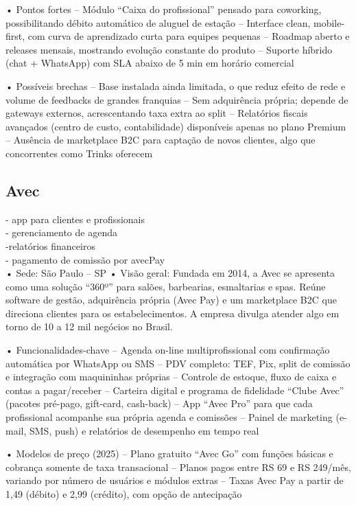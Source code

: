 • Pontos fortes
– Módulo “Caixa do profissional” pensado para coworking, possibilitando débito automático de aluguel de estação
– Interface clean, mobile-first, com curva de aprendizado curta para equipes pequenas
– Roadmap aberto e releases mensais, mostrando evolução constante do produto
– Suporte híbrido (chat + WhatsApp) com SLA abaixo de 5 min em horário comercial

• Possíveis brechas
– Base instalada ainda limitada, o que reduz efeito de rede e volume de feedbacks de grandes franquias
– Sem adquirência própria; depende de gateways externos, acrescentando taxa extra ao split
– Relatórios fiscais avançados (centro de custo, contabilidade) disponíveis apenas no plano Premium
– Ausência de marketplace B2C para captação de novos clientes, algo que concorrentes como Trinks oferecem

\subsection{Avec}


- app para clientes e profissionais\\
- gerenciamento de agenda\\
-relatórios financeiros\\
- pagamento de comissão por avecPay\\

• Sede: São Paulo – SP
• Visão geral: Fundada em 2014, a Avec se apresenta como uma solução “360º” para salões, barbearias, esmaltarias e spas. Reúne software de gestão, adquirência própria (Avec Pay) e um marketplace B2C que direciona clientes para os estabelecimentos. A empresa divulga atender algo em torno de 10 a 12 mil negócios no Brasil.

• Funcionalidades-chave
– Agenda on-line multi­profissional com confirmação automática por WhatsApp ou SMS
– PDV completo: TEF, Pix, split de comissão e integração com maquininhas próprias
– Controle de estoque, fluxo de caixa e contas a pagar/receber
– Carteira digital e programa de fidelidade “Clube Avec” (pacotes pré-pago, gift-card, cash-back)
– App “Avec Pro” para que cada profissional acompanhe sua própria agenda e comissões
– Painel de marketing (e-mail, SMS, push) e relatórios de desempenho em tempo real

• Modelos de preço (2025)
– Plano gratuito “Avec Go” com funções básicas e cobrança somente de taxa transacional
– Planos pagos entre RS 69 e RS 249/mês, variando por número de usuários e módulos extras
– Taxas Avec Pay a partir de 1,49 (débito) e 2,99 (crédito), com opção de antecipação

